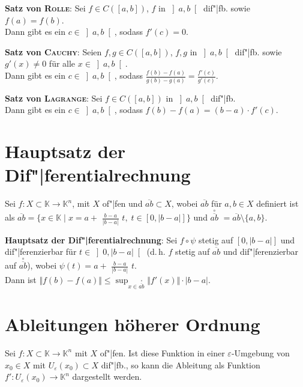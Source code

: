 \textbf{Satz von \textsc{Rolle}}:
Sei $f \in C([a,b])$, $f$ in $\left]a,b\right[$ dif"|fb. sowie
$f(a) = f(b)$. \\
Dann gibt es ein $c \in \left]a,b\right[$, sodass $f'(c) = 0$.

\textbf{Satz von \textsc{Cauchy}}:
Seien $f,g \in C([a,b])$, $f,g$ in $\left]a,b\right[$ dif"|fb. sowie
$g'(x) \not= 0$ für alle $x \in \left]a,b\right[$. \\
Dann gibt es ein $c \in \left]a,b\right[$, sodass
{\large $\frac{f(b) - f(a)}{g(b) - g(a)} = \frac{f'(c)}{g'(c)}$}.

\textbf{Satz von \textsc{Lagrange}}:
Sei $f \in C([a,b])$ in $\left]a,b\right[$ dif"|fb. \\
Dann gibt es ein $c \in \left]a,b\right[$, sodass
$f(b) - f(a) = (b - a) \cdot f'(c)$.

\section{%
    Hauptsatz der Dif"|ferentialrechnung%
}

Sei $f: X \subset \mathbb{K} \rightarrow \mathbb{K}^n$, mit $X$ of"|fen und
$\overline{ab} \subset X$, wobei $\overline{ab}$ für $a, b \in X$ definiert ist
als $\overline{ab} = \{x \in \mathbb{K} \;|\;
x = a +$ {\large $\frac{b - a}{|b - a|}$} $t,\; t \in [0, |b - a|]\}$ und
{\scriptsize $\overset{\circ}{\overline{ab}}$}
$= \overline{ab} \setminus \{a, b\}$.

\textbf{Hauptsatz der Dif"|ferentialrechnung}:
Sei $f \circ \psi$ stetig auf $[0, |b - a|]$ und dif"|ferenzierbar für
$t \in \left]0, |b - a|\right[$ (d.\,h. $f$ stetig auf $\overline{ab}$ und
dif"|ferenzierbar auf {\scriptsize $\overset{\circ}{\overline{ab}}$}), wobei
$\psi(t) = a +$ {\large $\frac{b - a}{|b - a|}$} $t$. \\
Dann ist $\Vert f(b) - f(a) \Vert \le
\sup_{x \in \overset{\circ}{\overline{ab}}} \Vert f'(x) \Vert \cdot |b - a|$.

\pagebreak

\section{%
    Ableitungen höherer Ordnung%
}

Sei $f: X \subset \mathbb{K} \rightarrow \mathbb{K}^n$ mit $X$ of"|fen.
Ist diese Funktion in einer $\varepsilon$-Umgebung von $x_0 \in X$
mit $U_\varepsilon(x_0) \subset X$ dif"|fb., so kann die Ableitung
als Funktion $f': U_\varepsilon(x_0) \rightarrow \mathbb{K}^n$ dargestellt
werden.

